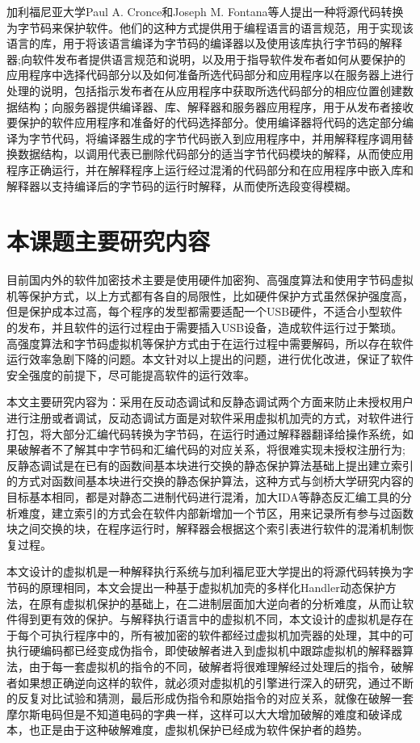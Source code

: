 加利福尼亚大学Paul A. Cronce和Joseph M. Fontana等人提出一种将源代码转换为字节码来保护软件\cite{2019White}。他们的这种方式提供用于编程语言的语言规范，用于实现该语言的库，用于将该语言编译为字节码的编译器以及使用该库执行字节码的解释器\cite{2019Implementing};向软件发布者提供语言规范和说明，以及用于指导软件发布者如何从要保护的应用程序中选择代码部分以及如何准备所选代码部分和应用程序以在服务器上进行处理的说明，包括指示发布者在从应用程序中获取所选代码部分的相应位置创建数据结构；向服务器提供编译器、库、解释器和服务器应用程序，用于从发布者接收要保护的软件应用程序和准备好的代码选择部分。使用编译器将代码的选定部分编译为字节代码，将编译器生成的字节代码嵌入到应用程序中\cite{2018Code}，并用解释程序调用替换数据结构，以调用代表已删除代码部分的适当字节代码模块的解释\cite{2018Method}，从而使应用程序正确运行\cite{2018Securing}，并在解释程序上运行经过混淆的代码部分和在应用程序中嵌入库和解释器以支持编译后的字节码的运行时解释，从而使所选段变得模糊\cite{2019Model}。




\section{本课题主要研究内容}

目前国内外的软件加密技术主要是使用硬件加密狗、高强度算法和使用字节码虚拟机等保护方式，以上方式都有各自的局限性，比如硬件保护方式虽然保护强度高，但是保护成本过高，每个程序的发型都需要适配一个USB硬件，不适合小型软件的发布，并且软件的运行过程由于需要插入USB设备，造成软件运行过于繁琐。高强度算法和字节码虚拟机等保护方式由于在运行过程中需要解码，所以存在软件运行效率急剧下降的问题。本文针对以上提出的问题，进行优化改进，保证了软件安全强度的前提下，尽可能提高软件的运行效率。

本文主要研究内容为：采用在反动态调试和反静态调试两个方面来防止未授权用户进行注册或者调试，反动态调试方面是对软件采用虚拟机加壳的方式，对软件进行打包，将大部分汇编代码转换为字节码，在运行时通过解释器翻译给操作系统，如果破解者不了解其中字节码和汇编代码的对应关系，将很难实现未授权注册行为;反静态调试是在已有的函数间基本块进行交换的静态保护算法基础上提出建立索引的方式对函数间基本块进行交换的静态保护算法，这种方式与剑桥大学研究内容的目标基本相同，都是对静态二进制代码进行混淆，加大IDA等静态反汇编工具的分析难度，建立索引的方式会在软件内部新增加一个节区，用来记录所有参与过函数块之间交换的块，在程序运行时，解释器会根据这个索引表进行软件的混淆机制恢复过程。

本文设计的虚拟机是一种解释执行系统与加利福尼亚大学提出的将源代码转换为字节码的原理相同，本文会提出一种基于虚拟机加壳的多样化Handler动态保护方法，在原有虚拟机保护的基础上，在二进制层面加大逆向者的分析难度，从而让软件得到更有效的保护。与解释执行语言中的虚拟机不同，本文设计的虚拟机是存在于每个可执行程序中的，所有被加密的软件都经过虚拟机加壳器的处理，其中的可执行硬编码都已经变成伪指令，即使破解者进入到虚拟机中跟踪虚拟机的解释器算法，由于每一套虚拟机的指令的不同，破解者将很难理解经过处理后的指令，破解者如果想正确逆向这样的软件，就必须对虚拟机的引擎进行深入的研究，通过不断的反复对比试验和猜测，最后形成伪指令和原始指令的对应关系，就像在破解一套摩尔斯电码但是不知道电码的字典一样，这样可以大大增加破解的难度和破译成本，也正是由于这种破解难度，虚拟机保护已经成为软件保护者的趋势。
